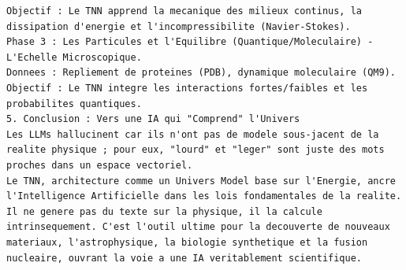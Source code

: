 \documentclass[11pt,a4paper]{article}
\begin{document}
\begin{lstlisting}[language={}, caption={}, basicstyle=\ttfamily\footnotesize, breaklines=true]
Objectif : Le TNN apprend la mecanique des milieux continus, la dissipation d'energie et l'incompressibilite (Navier-Stokes).
Phase 3 : Les Particules et l'Equilibre (Quantique/Moleculaire) - L'Echelle Microscopique.
Donnees : Repliement de proteines (PDB), dynamique moleculaire (QM9).
Objectif : Le TNN integre les interactions fortes/faibles et les probabilites quantiques.
5. Conclusion : Vers une IA qui "Comprend" l'Univers
Les LLMs hallucinent car ils n'ont pas de modele sous-jacent de la realite physique ; pour eux, "lourd" et "leger" sont juste des mots proches dans un espace vectoriel.
Le TNN, architecture comme un Univers Model base sur l'Energie, ancre l'Intelligence Artificielle dans les lois fondamentales de la realite. Il ne genere pas du texte sur la physique, il la calcule intrinsequement. C'est l'outil ultime pour la decouverte de nouveaux materiaux, l'astrophysique, la biologie synthetique et la fusion nucleaire, ouvrant la voie a une IA veritablement scientifique.

\end{lstlisting}
\end{document}
